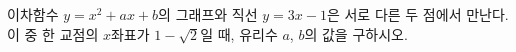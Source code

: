 이차함수 $y=x^2+ax+b$의 그래프와 직선 $y=3x-1$은 서로 다른 두 점에서 만난다. 이 중 한 교점의 $x$좌표가 $1-\sqrt{2}$일 때, 유리수 $a$, $b$의 값을 구하시오.
